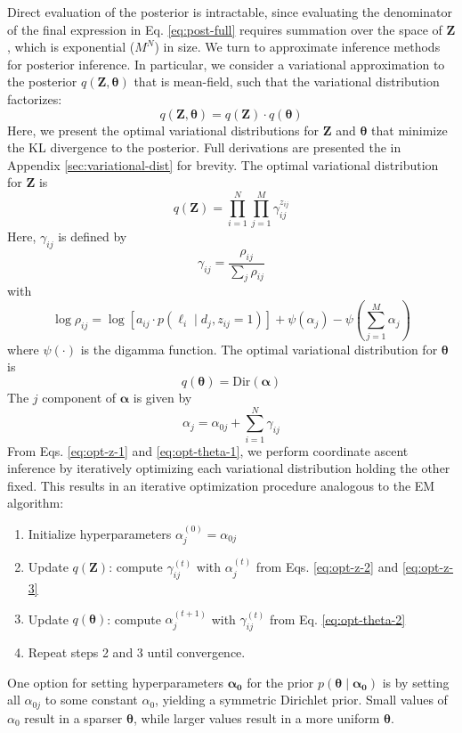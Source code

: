 Direct evaluation of the posterior is intractable, since evaluating the denominator of the final expression in Eq. \ref{eq:post-full} requires summation over the space of $\bm{Z}$, which is exponential ($M^N$) in size. We turn to approximate inference methods for posterior inference. In particular, we consider a variational approximation to the posterior $q(\bm{Z},\bm{\theta})$ that is mean-field, such that the variational distribution factorizes:
\begin{equation}
    q(\bm{Z},\bm{\theta})=q(\bm{Z})\cdot q(\bm\theta)
\end{equation}
Here, we present the optimal variational distributions for $\bm{Z}$ and $\bm\theta$ that minimize the KL divergence to the posterior. Full derivations are presented the in Appendix \ref{sec:variational-dist} for brevity. The optimal variational distribution for $\bm{Z}$ is
\begin{equation}\label{eq:opt-z-1}
    q(\bm{Z})=\prod_{i=1}^N\prod_{j=1}^M \gamma_{ij}^{z_{ij}}
\end{equation}
Here, $\gamma_{ij}$ is defined by 
\begin{equation}\label{eq:opt-z-2}
    \gamma_{ij}=\frac{\rho_{ij}}{\sum_j\rho_{ij}}
\end{equation}
with
\begin{equation}\label{eq:opt-z-3}
    \log\rho_{ij}=\log\left[a_{ij}\cdot p(\ell_i\mid d_j,z_{ij}=1)\right]+\psi(\alpha_j)-\psi\left(\sum_{j=1}^M\alpha_j\right)
\end{equation}
where $\psi(\cdot)$ is the digamma function. 
The optimal variational distribution for $\bm\theta$ is
\begin{equation}\label{eq:opt-theta-1}
    q(\bm\theta) = \mathrm{Dir}(\bm\alpha)
\end{equation}
The $j$ component of $\bm\alpha$ is given by
\begin{equation}\label{eq:opt-theta-2}
    \alpha_j=\alpha_{0j}+\sum_{i=1}^N\gamma_{ij}
\end{equation}
From Eqs. \ref{eq:opt-z-1} and \ref{eq:opt-theta-1}, we perform coordinate ascent inference by iteratively optimizing each variational distribution holding the other fixed. This results in an iterative optimization procedure analogous to the EM algorithm:
\begin{enumerate}
    \item Initialize hyperparameters $\alpha_j^{(0)}=\alpha_{0j}$
    \item Update $q(\bm{Z})$: compute $\gamma_{ij}^{(t)}$  with $\alpha_j^{(t)}$ from Eqs. \ref{eq:opt-z-2} and \ref{eq:opt-z-3}
    \item Update $q(\bm\theta)$: compute $\alpha_{j}^{(t+1)}$  with $\gamma_{ij}^{(t)}$ from Eq. \ref{eq:opt-theta-2}
    \item Repeat steps 2 and 3 until convergence. 
\end{enumerate}
One option for setting hyperparameters $\bm{\alpha_0}$ for the prior $p(\bm\theta\mid\bm{\alpha_0})$ is by setting all $\alpha_{0j}$ to some constant $\alpha_0$, yielding a symmetric Dirichlet prior. Small values of $\alpha_0$ result in a sparser $\bm\theta$, while larger values result in a more uniform $\bm\theta$.   

